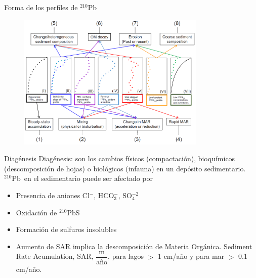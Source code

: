 \documentclass[9pt]{beamer}
\newcommand{\PbCero}{$^{210}$Pb}
\begin{document}
\begin{frame}[noframenumbering, label=Shape]{Forma de los perfiles de \PbCero}
\begin{figure}
\includegraphics[width=0.8\textwidth]{Imagenes/Shape.png}
\end{figure}

	\begin{flushright}
	\hyperlink{Portada}{}
	\end{flushright}
\end{frame}

\begin{frame}[noframenumbering, label=Diagenesis]{Diagénesis}
Diagénesis: son los cambios físicos (compactación), bioquímicos (descomposición de hojas) o biológicos (infauna) en un depósito sedimentario. 
\\
\PbCero\, en el sedimentario puede ser afectado por 
\begin{itemize}
\item Presencia de aniones Cl$^{-}$, HCO$_3^{-}$, SO$_4^{-2}$
\item Oxidación de $^{210}$PbS
\item Formación de sulfuros insolubles
\item Aumento de SAR implica la descomposición de Materia Orgánica. Sediment Rate Acumulation, SAR, $\dfrac{\text{m}}{\text{año}}$, para lagos $>$ 1 cm/año y para mar $>$ 0.1 cm/año. 
\end{itemize}
	\begin{flushright}
	\hyperlink{Portada}{\beamerbutton{Portada}}
	\end{flushright}
\end{frame}
\end{document}
